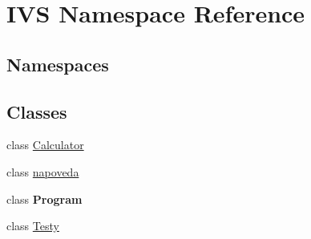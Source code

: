 \hypertarget{namespace_i_v_s}{}\section{I\+VS Namespace Reference}
\label{namespace_i_v_s}
\subsection*{Namespaces}
\begin{DoxyCompactItemize}
\end{DoxyCompactItemize}
\subsection*{Classes}
\begin{DoxyCompactItemize}
\item 
class \mbox{\hyperlink{class_i_v_s_1_1_calculator}{Calculator}}
\item 
class \mbox{\hyperlink{class_i_v_s_1_1napoveda}{napoveda}}
\item 
class {\bfseries Program}
\item 
class \mbox{\hyperlink{class_i_v_s_1_1_testy}{Testy}}
\end{DoxyCompactItemize}
